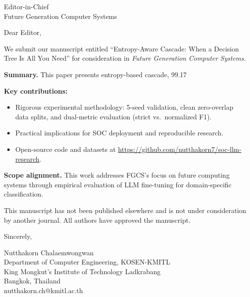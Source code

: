 \documentclass[11pt]{letter}
\begin{document}
\begin{letter}{Editor-in-Chief \\ Future Generation Computer Systems}

\opening{Dear Editor,}

We submit our manuscript entitled ``Entropy-Aware Cascade: When a Decision Tree Is All You Need'' for consideration in \textit{Future Generation Computer Systems}.

\textbf{Summary.} This paper presents entropy-based cascade, 99.17%

\textbf{Key contributions:}
\begin{itemize}
\item Rigorous experimental methodology: 5-seed validation, clean zero-overlap data splits, and dual-metric evaluation (strict vs.\ normalized F1).
\item Practical implications for SOC deployment and reproducible research.
\item Open-source code and datasets at \url{https://github.com/nutthakorn7/soc-llm-research}.
\end{itemize}

\textbf{Scope alignment.} This work addresses FGCS's focus on future computing systems through empirical evaluation of LLM fine-tuning for domain-specific classification.

This manuscript has not been published elsewhere and is not under consideration by another journal. All authors have approved the manuscript.

\closing{Sincerely,}

Nutthakorn Chalaemwongwan \\
Department of Computer Engineering, KOSEN-KMITL \\
King Mongkut's Institute of Technology Ladkrabang \\
Bangkok, Thailand \\
nutthakorn.ch@kmitl.ac.th

\end{letter}
\end{document}
